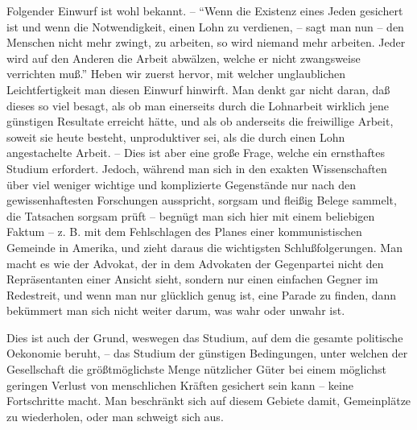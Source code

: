 \documentclass{scrbook}
\begin{document}
Folgender Einwurf ist wohl bekannt. – ``Wenn die Existenz eines Jeden gesichert ist und wenn die Notwendigkeit, einen Lohn zu verdienen, – sagt man nun – den Menschen nicht mehr zwingt, zu arbeiten, so wird niemand mehr arbeiten. Jeder wird auf den Anderen die Arbeit abwälzen, welche er nicht zwangsweise verrichten muß.'' Heben wir zuerst hervor, mit welcher unglaublichen Leichtfertigkeit man diesen Einwurf hinwirft. Man denkt gar nicht daran, daß dieses so viel besagt, als ob man einerseits durch die Lohnarbeit wirklich jene günstigen Resultate erreicht hätte, und als ob anderseits die freiwillige Arbeit, soweit sie heute besteht, unproduktiver sei, als die durch einen Lohn angestachelte Arbeit. – Dies ist aber eine große Frage, welche ein ernsthaftes Studium erfordert. Jedoch, während man sich in den exakten Wissenschaften über viel weniger wichtige und komplizierte Gegenstände nur nach den gewissenhaftesten Forschungen ausspricht, sorgsam und fleißig Belege sammelt, die Tatsachen sorgsam prüft – begnügt man sich hier mit einem beliebigen Faktum – z. B. mit dem Fehlschlagen des Planes einer kommunistischen Gemeinde in Amerika, und zieht daraus die wichtigsten Schlußfolgerungen. Man macht es wie der Advokat, der in dem Advokaten der Gegenpartei nicht den Repräsentanten einer Ansicht sieht, sondern nur einen einfachen Gegner im Redestreit, und wenn man nur glücklich genug ist, eine Parade zu finden, dann bekümmert man sich nicht weiter darum, was wahr oder unwahr ist.

Dies ist auch der Grund, weswegen das Studium, auf dem die gesamte politische Oekonomie beruht, – das Studium der günstigen Bedingungen, unter welchen der Gesellschaft die größtmöglichste Menge nützlicher Güter bei einem möglichst geringen Verlust von menschlichen Kräften gesichert sein kann – keine Fortschritte macht. Man beschränkt sich auf diesem Gebiete damit, Gemeinplätze zu wiederholen, oder man schweigt sich aus.
\end{document}
